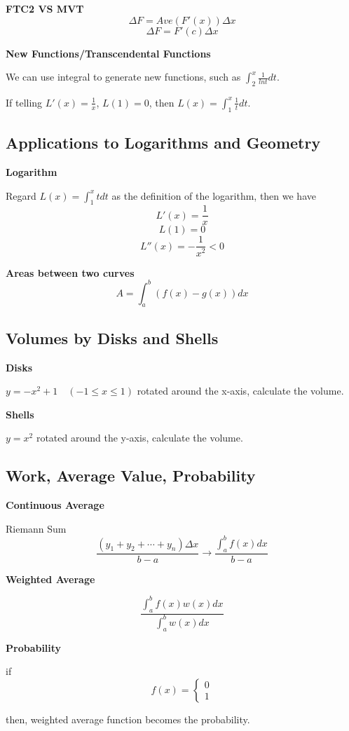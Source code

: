 \documentclass{article}
\newcommand\defint[3]{\int_{#1}^{#2}#3dx}
\newcommand\upperxdefint[2]{\int_{#1}^x{#2}dt}
\begin{document}
\textbf{FTC2 VS MVT}
$$\Delta F = Ave(F'(x))\Delta x$$
$$\Delta F = F'(c)\Delta x$$

\textbf{New Functions/Transcendental Functions}

We can use integral to generate new functions, such as $\upperxdefint{2}{\frac{1}{lnt}}$.

If telling $L'(x) = \frac{1}{x}$, $L(1) = 0$, then $L(x) = \upperxdefint{1}{\frac{1}{t}}$.

\subsection{Applications to Logarithms and Geometry}

\textbf{Logarithm}

Regard $L(x) = \upperxdefint{1}{t}$ as the definition of the logarithm, then we have
$$L'(x) = \frac{1}{x}$$
$$L(1) = 0$$
$$L''(x) = -\frac{1}{x^2} < 0$$

\textbf{Areas between two curves}
$$A = \defint{a}{b}{(f(x) - g(x))}$$

\subsection{Volumes by Disks and Shells}

\textbf{Disks}

$y = -x^2+1 \quad (-1 \le x \le 1)$ rotated around the x-axis, calculate the volume.

\textbf{Shells}

$y = x^2$ rotated around the y-axis, calculate the volume.

\subsection{Work, Average Value, Probability}

\textbf{Continuous Average}

Riemann Sum
$$\frac{(y_1+y_2+\cdots+y_n)\Delta x}{b-a} \rightarrow \frac{\defint{a}{b}{f(x)}}{b-a}$$

\textbf{Weighted Average}

$$\frac{\defint{a}{b}{f(x)w(x)}}{\defint{a}{b}{w(x)}}$$

\textbf{Probability}

if
$$
f(x)=
\begin{cases}
0 \\
1
\end{cases}
$$

then, weighted average function becomes the probability.
\end{document}
